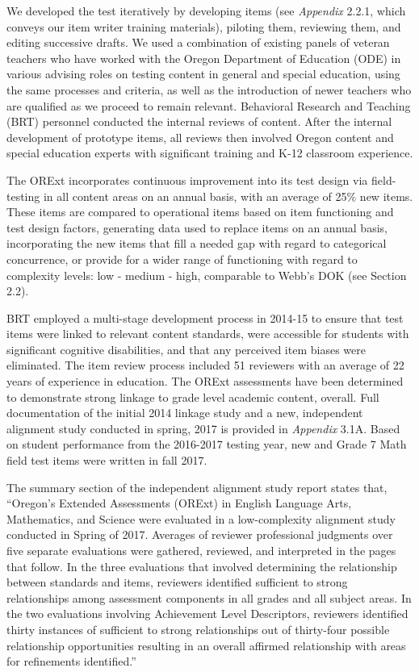\documentclass[]{article}
\begin{document}
We developed the test iteratively by developing items (see
\emph{Appendix} 2.2.1, which conveys our item writer training
materials), piloting them, reviewing them, and editing successive
drafts. We used a combination of existing panels of veteran teachers who
have worked with the Oregon Department of Education (ODE) in various
advising roles on testing content in general and special education,
using the same processes and criteria, as well as the introduction of
newer teachers who are qualified as we proceed to remain relevant.
Behavioral Research and Teaching (BRT) personnel conducted the internal
reviews of content. After the internal development of prototype items,
all reviews then involved Oregon content and special education experts
with significant training and K-12 classroom experience.

The ORExt incorporates continuous improvement into its test design via
field-testing in all content areas on an annual basis, with an average
of 25\% new items. These items are compared to operational items based
on item functioning and test design factors, generating data used to
replace items on an annual basis, incorporating the new items that fill
a needed gap with regard to categorical concurrence, or provide for a
wider range of functioning with regard to complexity levels: low -
medium - high, comparable to Webb's DOK (see Section 2.2).

BRT employed a multi-stage development process in 2014-15 to ensure that
test items were linked to relevant content standards, were accessible
for students with significant cognitive disabilities, and that any
perceived item biases were eliminated. The item review process included
51 reviewers with an average of 22 years of experience in education. The
ORExt assessments have been determined to demonstrate strong linkage to
grade level academic content, overall. Full documentation of the initial
2014 linkage study and a new, independent alignment study conducted in
spring, 2017 is provided in \emph{Appendix} 3.1A. Based on student
performance from the 2016-2017 testing year, new and Grade 7 Math field
test items were written in fall 2017.

The summary section of the independent alignment study report states
that, ``Oregon's Extended Assessments (ORExt) in English Language Arts,
Mathematics, and Science were evaluated in a low-complexity alignment
study conducted in Spring of 2017. Averages of reviewer professional
judgments over five separate evaluations were gathered, reviewed, and
interpreted in the pages that follow. In the three evaluations that
involved determining the relationship between standards and items,
reviewers identified sufficient to strong relationships among assessment
components in all grades and all subject areas. In the two evaluations
involving Achievement Level Descriptors, reviewers identified thirty
instances of sufficient to strong relationships out of thirty-four
possible relationship opportunities resulting in an overall affirmed
relationship with areas for refinements identified.''
\end{document}
